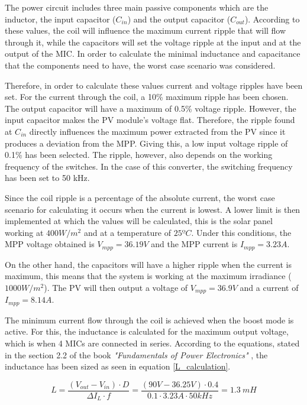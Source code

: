 The power circuit includes three main passive components which are the inductor, the input capacitor ($C_{in}$) and the output capacitor ($C_{out}$). According to these values, the coil will influence the maximum current ripple that will flow through it, while the capacitors will set the voltage ripple at the input and at the output of the MIC. In order to calculate the minimal inductance and capacitance that the components need to have, the worst case scenario was considered.

Therefore, in order to calculate these values current and voltage ripples have been set. For the current through the coil, a 10\% maximum ripple has been chosen. The output capacitor will  have a maximum of 0.5\% voltage ripple. However, the input capacitor makes the PV module's voltage flat. Therefore, the ripple found at $C_{in}$ directly influences the maximum power extracted from the PV since it produces a deviation from the MPP. Giving this, a low input voltage ripple of 0.1\% has been selected. The ripple, however, also depends on the working frequency of the switches. In the case of this converter, the switching frequency has been set to 50 kHz. 

Since the coil ripple is a percentage of the absolute current, the worst case scenario for calculating it occurs when the current is lowest. A lower limit is then implemented at which the values will be calculated, this is the solar panel working at $400 W/m^2$ and at a temperature of $25 ºC$. Under this conditions, the MPP voltage obtained is $V_{mpp} = 36.19 V$ and the MPP current is $I_{mpp} = 3.23A$.

On the other hand, the capacitors will have a higher ripple when the current is maximum, this means that the system is working at the maximum irradiance ($1000 W/m^2$). The PV will then output a voltage of $V_{mpp} = 36.9 V$ and a current of $I_{mpp} = 8.14 A$.

The minimum current flow through the coil is achieved when the boost mode is active. For this, the inductance is calculated for the maximum output voltage, which is when 4 MICs are connected in series. According to the equations, stated in the section 2.2 of the book \textit{"Fundamentals of Power Electronics"} \cite{Erickson}, the inductance has been sized as seen in equation \ref{L_calculation}.

\begin{equation} \label{L_calculation}
L = \frac{(V_{out} - V_{in}) \cdot D}{\Delta I_{L} \cdot f} = \frac{(90 V - 36.25 V) \cdot 0.4}{0.1 \cdot 3.23 A \cdot 50 kHz} = 1.3 \ mH
\end{equation}

